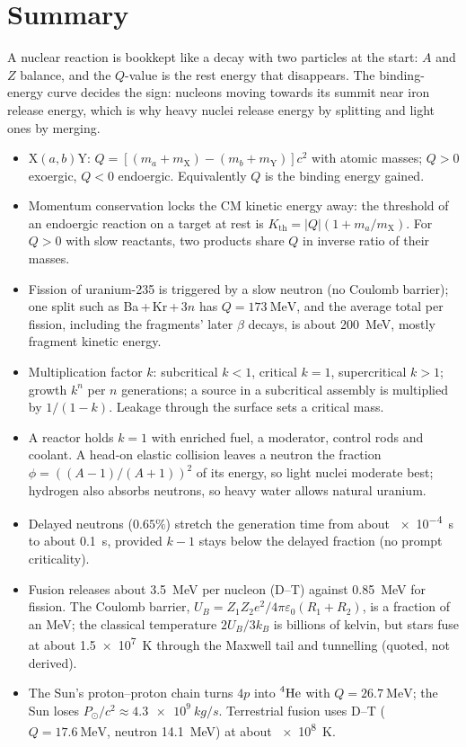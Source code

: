 \section{Summary}\label{sec:react-summary}
A nuclear reaction is bookkept like a decay with two particles at the start: $A$ and $Z$ balance, and the
$Q$-value is the rest energy that disappears. The binding-energy curve decides the sign: nucleons moving
towards its summit near iron release energy, which is why heavy nuclei release energy by splitting and
light ones by merging.

\begin{itemize}
\item $\mathrm X(a,b)\mathrm Y$: $Q=[(m_a+m_{\mathrm X})-(m_b+m_{\mathrm Y})]c^2$ with atomic masses;
      $Q>0$ exoergic, $Q<0$ endoergic. Equivalently $Q$ is the binding energy gained.
\item Momentum conservation locks the CM kinetic energy away: the threshold of an endoergic reaction on a
      target at rest is $K_{\text{th}}=|Q|(1+m_a/m_{\mathrm X})$. For $Q>0$ with slow reactants, two
      products share $Q$ in inverse ratio of their masses.
\item Fission of uranium-235 is triggered by a slow neutron (no Coulomb barrier); one split such as
      Ba\,+\,Kr\,+\,3$n$ has $Q=\SI{173}{\MeV}$, and the average total per fission, including the
      fragments' later $\beta$ decays, is about \SI{200}{\MeV}, mostly fragment kinetic energy.
\item Multiplication factor $k$: subcritical $k<1$, critical $k=1$, supercritical $k>1$; growth $k^n$ per
      $n$ generations; a source in a subcritical assembly is multiplied by $1/(1-k)$. Leakage through the
      surface sets a critical mass.
\item A reactor holds $k=1$ with enriched fuel, a moderator, control rods and coolant. A head-on elastic
      collision leaves a neutron the fraction $\phi=((A-1)/(A+1))^2$ of its energy, so light nuclei
      moderate best; hydrogen also absorbs neutrons, so heavy water allows natural uranium.
\item Delayed neutrons ($0.65\%$) stretch the generation time from about \SI{e-4}{s} to about \SI{0.1}{s},
      provided $k-1$ stays below the delayed fraction (no prompt criticality).
\item Fusion releases about \SI{3.5}{\MeV} per nucleon (D--T) against \SI{0.85}{\MeV} for fission. The
      Coulomb barrier, $U_B=Z_1Z_2e^2/4\pi\varepsilon_0(R_1+R_2)$, is a fraction of an MeV; the classical
      temperature $2U_B/3k_B$ is billions of kelvin, but stars fuse at about \SI{1.5e7}{K} through the
      Maxwell tail and tunnelling (quoted, not derived).
\item The Sun's proton--proton chain turns $4p$ into $\prescript{4}{}{\mathrm{He}}$ with $Q=\SI{26.7}{\MeV}$; the Sun loses
      $P_\odot/c^2\approx\SI{4.3e9}{kg/s}$. Terrestrial fusion uses D--T ($Q=\SI{17.6}{\MeV}$, neutron
      \SI{14.1}{\MeV}) at about \SI{e8}{K}.
\end{itemize}

